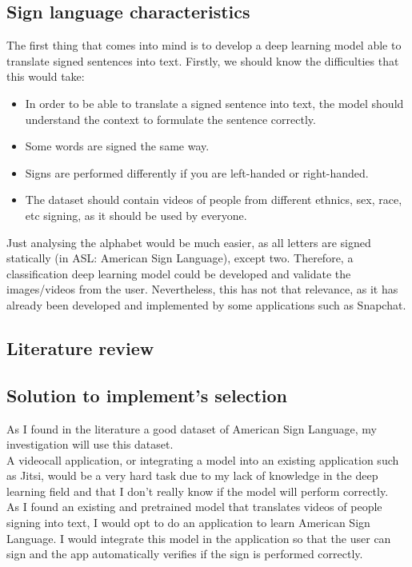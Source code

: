 \subsection{Sign language characteristics}
The first thing that comes into mind is to develop a deep learning model able to translate signed sentences into 
text. Firstly, we should know the difficulties that this would take:
\begin{itemize}
    \item In order to be able to translate a signed sentence into text, the model should understand the context to formulate the sentence correctly.
    \item Some words are signed the same way.
    \item Signs are performed differently if you are left-handed or right-handed.
    \item The dataset should contain videos of people from different ethnics, sex, race, etc signing, as it should be used by everyone.
\end{itemize}

Just analysing the alphabet would be much easier, as all letters are signed statically (in ASL: American Sign Language), except two.
Therefore, a classification deep learning model could be developed and validate the images/videos from the user.
Nevertheless, this has not that relevance, as it has already been developed and implemented by some applications such as Snapchat.

\subsection{Literature review}

\subsection{Solution to implement's selection}
As I found in the literature a good dataset of American Sign Language, my investigation will use this dataset. \\

A videocall application, or integrating a model into an existing application such as Jitsi, would be a very hard task due to my lack of knowledge in the deep learning field and that I don't really know if the model will perform correctly. \\ 

As I found an existing and pretrained model that translates videos of people signing into text, I would opt to do an application to learn American Sign Language. I would integrate this model in the application so that the user can sign and the app automatically verifies if the sign is performed correctly.
